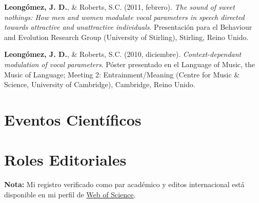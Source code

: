 \documentclass[11pt,a4paper,]{awesome-cv}
\begin{document}
\textbf{Leongómez, J. D.}, \& Roberts, S.C. (2011, febrero). \emph{The
sound of sweet nothings: How men and women modulate vocal parameters in
speech directed towards attractive and unattractive individuals}.
Presentación para el Behaviour and Evolution Research Group (University
of Stirling), Stirling, Reino Unido.

\textbf{Leongómez, J. D.}, \& Roberts, S.C. (2010, diciembre).
\emph{Context-dependant modulation of vocal parameters}. Póster
presentado en el Language of Music, the Music of Language; Meeting 2:
Entrainment/Meaning (Centre for Music \& Science, University of
Cambridge), Cambridge, Reino Unido.

\endgroup

\hypertarget{eventos-cientuxedficos}{%
\section{Eventos Científicos}\label{eventos-cientuxedficos}}

\begin{cventries}
\end{cventries}

\hypertarget{roles-editoriales}{%
\section{Roles Editoriales}\label{roles-editoriales}}

\begin{small}
\textbf{Nota:} Mi registro verificado como par académico y editos internacional está disponible en mi perfil de \href{https://www.webofscience.com/wos/author/record/387716}{Web of Science}.
\end{small}
\end{document}
